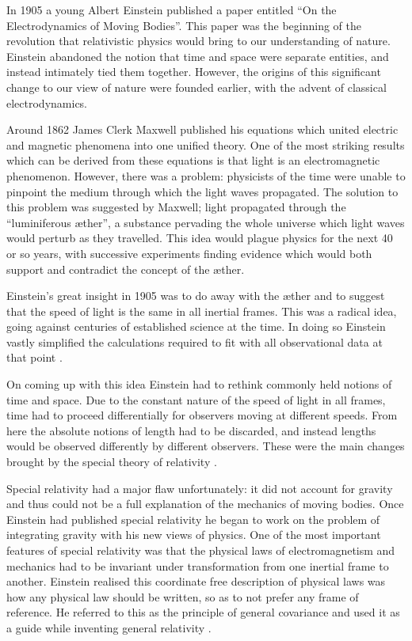 
In 1905 a young Albert Einstein published a paper entitled ``On the Electrodynamics of Moving Bodies''. This paper was the beginning of the revolution that relativistic physics would bring to our understanding of nature. Einstein abandoned the notion that time and space were separate entities, and instead intimately tied them together. However, the origins of this significant change to our view of nature were founded earlier, with the advent of classical electrodynamics. 

Around 1862 James Clerk Maxwell published his equations which united electric and magnetic phenomena into one unified theory. One of the most striking results which can be derived from these equations is that light is an electromagnetic phenomenon. However, there was a problem: physicists of the time were unable to pinpoint the medium through which the light waves propagated. The solution to this problem was suggested by Maxwell; light propagated through the ``luminiferous \ae ther'', a substance pervading the whole universe which light waves would perturb as they travelled. This idea would plague physics for the next 40 or so years, with successive experiments finding evidence which would both support and contradict the concept of the \ae ther.

Einstein's great insight in 1905 was to do away with the \ae ther and to suggest that the speed of light is the same in all inertial frames. This was a radical idea, going against centuries of established science at the time. In doing so Einstein vastly simplified the calculations required to fit with all observational data at that point \cite{cheng}. 

On coming up with this idea Einstein had to rethink commonly held notions of time and space. Due to the constant nature of the speed of light in all frames, time had to proceed differentially for observers moving at different speeds. From here the absolute notions of length had to be discarded, and instead lengths would be observed differently by different observers. These were the main changes brought by the special theory of relativity \cite{cheng}. 

Special relativity had a major flaw unfortunately: it did not account for gravity and thus could not be a full explanation of the mechanics of moving bodies. Once Einstein had published special relativity he began to work on the problem of integrating gravity with his new views of physics. One of the most important features of special relativity was that the physical laws of electromagnetism and mechanics had to be invariant under transformation from one inertial frame to another. Einstein realised this coordinate free description of physical laws was how any physical law should be written, so as to not prefer any frame of reference. He referred to this as the principle of general covariance and used it as a guide while inventing general relativity \cite{history}. 

